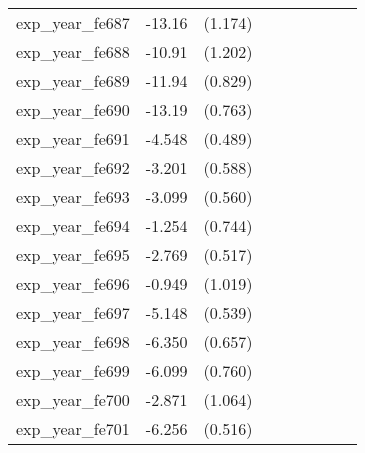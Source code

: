 {\begin{tabular}{l*{4}{cc}}
exp\_year\_fe687&   -13.16\sym{***}&  (1.174)&                  &         &                  &         &                  &         \\
exp\_year\_fe688&   -10.91\sym{***}&  (1.202)&                  &         &                  &         &                  &         \\
exp\_year\_fe689&   -11.94\sym{***}&  (0.829)&                  &         &                  &         &                  &         \\
exp\_year\_fe690&   -13.19\sym{***}&  (0.763)&                  &         &                  &         &                  &         \\
exp\_year\_fe691&   -4.548\sym{***}&  (0.489)&                  &         &                  &         &                  &         \\
exp\_year\_fe692&   -3.201\sym{***}&  (0.588)&                  &         &                  &         &                  &         \\
exp\_year\_fe693&   -3.099\sym{***}&  (0.560)&                  &         &                  &         &                  &         \\
exp\_year\_fe694&   -1.254         &  (0.744)&                  &         &                  &         &                  &         \\
exp\_year\_fe695&   -2.769\sym{***}&  (0.517)&                  &         &                  &         &                  &         \\
exp\_year\_fe696&   -0.949         &  (1.019)&                  &         &                  &         &                  &         \\
exp\_year\_fe697&   -5.148\sym{***}&  (0.539)&                  &         &                  &         &                  &         \\
exp\_year\_fe698&   -6.350\sym{***}&  (0.657)&                  &         &                  &         &                  &         \\
exp\_year\_fe699&   -6.099\sym{***}&  (0.760)&                  &         &                  &         &                  &         \\
exp\_year\_fe700&   -2.871\sym{**} &  (1.064)&                  &         &                  &         &                  &         \\
exp\_year\_fe701&   -6.256\sym{***}&  (0.516)&                  &         &                  &         &                  &         \\

\end{tabular}}

